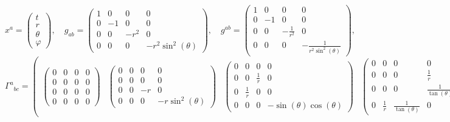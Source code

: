 \documentclass[11pt]{article}
\begin{document}
    $$x^{a}=\begin{pmatrix}t\\r\\\theta\\\varphi\end{pmatrix},\quad g_{ab}=\begin{pmatrix} 1 & 0 & 0 & 0\\ 0 & -1 & 0 & 0\\ 0 & 0 & - r^{2} & 0\\ 0 & 0 & 0 & - r^{2} \sin^{2}{\left(\theta \right)} \end{pmatrix},\quad g^{ab}=\begin{pmatrix} 1 & 0 & 0 & 0\\ 0 & -1 & 0 & 0\\ 0 & 0 & - \frac{1}{r^{2}} & 0\\ 0 & 0 & 0 & - \frac{1}{r^{2} \sin^{2}{\left(\theta \right)}} \end{pmatrix},$$
$${\Gamma^{a}}_{bc}=\begin{pmatrix} \begin{pmatrix} 0 & 0 & 0 & 0\\ 0 & 0 & 0 & 0\\ 0 & 0 & 0 & 0\\ 0 & 0 & 0 & 0 \end{pmatrix} & \begin{pmatrix} 0 & 0 & 0 & 0\\ 0 & 0 & 0 & 0\\ 0 & 0 & - r & 0\\ 0 & 0 & 0 & - r \sin^{2}{\left(\theta \right)} \end{pmatrix} & \begin{pmatrix} 0 & 0 & 0 & 0\\ 0 & 0 & \frac{1}{r} & 0\\ 0 & \frac{1}{r} & 0 & 0\\ 0 & 0 & 0 & - \sin{\left(\theta \right)} \cos{\left(\theta \right)} \end{pmatrix} & \begin{pmatrix} 0 & 0 & 0 & 0\\ 0 & 0 & 0 & \frac{1}{r}\\ 0 & 0 & 0 & \frac{1}{\tan{\left(\theta \right)}}\\ 0 & \frac{1}{r} & \frac{1}{\tan{\left(\theta \right)}} & 0 \end{pmatrix} \end{pmatrix},$$
\end{document}
